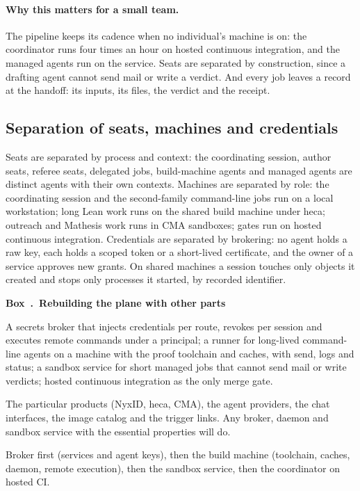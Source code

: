\documentclass[11pt]{article}
\newcounter{protocolbox}
\newenvironment{protocol}[1]{\refstepcounter{protocolbox}\begin{framed}\noindent\textbf{Box~\theprotocolbox.\ #1}\par\small}{\end{framed}}
\begin{document}
\paragraph{Why this matters for a small team.} The pipeline keeps its cadence
when no individual's machine is on: the coordinator runs four times an hour on
hosted continuous integration, and the managed agents run on the service.
Seats are separated by construction, since a drafting agent cannot send mail
or write a verdict. And every job leaves a record at the handoff: its inputs,
its files, the verdict and the receipt.

\subsection{Separation of seats, machines and credentials}
Seats are separated by process and context: the coordinating session, author
seats, referee seats, delegated jobs, build-machine agents and managed agents
are distinct agents with their own contexts. Machines are separated by role:
the coordinating session and the second-family command-line jobs run on a
local workstation; long Lean work runs on the shared build machine under
heca; outreach and Mathesis work runs in CMA sandboxes; gates run on hosted
continuous integration. Credentials are separated by brokering: no agent
holds a raw key, each holds a scoped token or a short-lived certificate, and
the owner of a service approves new grants. On shared machines a session
touches only objects it created and stops only processes it started, by
recorded identifier.

\begin{protocol}{Rebuilding the plane with other parts}
\label{box:rebuild}
\begin{description}[leftmargin=0pt,itemsep=1pt,font=\normalfont\bfseries]
\item[Essential] A secrets broker that injects credentials per route, revokes
per session and executes remote commands under a principal; a runner for
long-lived command-line agents on a machine with the proof toolchain and
caches, with send, logs and status; a sandbox service for short managed jobs
that cannot send mail or write verdicts; hosted continuous integration as the
only merge gate.
\item[Incidental] The particular products (NyxID, heca, CMA), the agent
providers, the chat interfaces, the image catalog and the trigger links. Any
broker, daemon and sandbox service with the essential properties will do.
\item[Order of setup] Broker first (services and agent keys), then the build
machine (toolchain, caches, daemon, remote execution), then the sandbox
service, then the coordinator on hosted CI.
\end{description}
\end{protocol}
\end{document}

